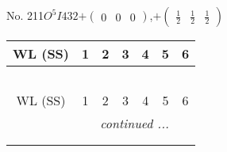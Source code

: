 \documentclass[fleqn,9pt,landscape]{jsarticle}
\begin{document}
\newpage
No. 211\quad$O_{}^{5}$\quad$I432$\quad[ cubic ]\quad$+\begin{pmatrix} 0 & 0 & 0 \end{pmatrix}$,\quad $+\begin{pmatrix} \frac{1}{2} & \frac{1}{2} & \frac{1}{2} \end{pmatrix}$
\begin{center}
\renewcommand{\arraystretch}{1.2}
\begin{longtable}{ccccccc}
 \hline \hline
WL (SS) & 1 & 2 & 3 & 4 & 5 & 6 \\ \hline \endfirsthead

\multicolumn{6}{l}{\tablename\ \thetable{}} \\
 \hline \hline
WL (SS) & 1 & 2 & 3 & 4 & 5 & 6 \\ \hline \endhead

 \hline \hline
\multicolumn{6}{r}{\footnotesize\it continued ...} \\ \endfoot

 \hline \hline
\multicolumn{6}{r}{} \\ \endlastfoot


\end{longtable}
\end{center}
\end{document}
